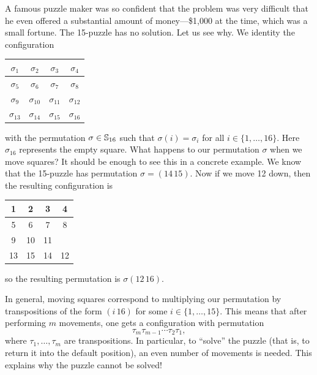 A famous puzzle maker was so confident that the problem was very difficult 
that he even offered a substantial amount of money—\$1,000 at the time, which was a small fortune. 
The 15-puzzle has no solution. Let us see why.
We identity the configuration 
\bigskip 
    \begin{center}
        \begin{tabular}{|c|c|c|c|}
            \hline
            $\sigma_1$ & $\sigma_2$ & $\sigma_3$ & $\sigma_4$\\
            \hline
            $\sigma_5$ & $\sigma_6$ & $\sigma_7$ & $\sigma_8$\\
            \hline
            $\sigma_9$ & $\sigma_{10}$ & $\sigma_{11}$ & $\sigma_{12}$\\
            \hline
            $\sigma_{13}$ & $\sigma_{14}$ & $\sigma_{15}$ & $\sigma_{16}$\\
            \hline
        \end{tabular}
    \end{center}
\bigskip 
with the permutation $\sigma\in\mathbb{S}_{16}$ such that  
$\sigma(i)=\sigma_i$ for all $i\in\{1,\dots,16\}$. Here $\sigma_{16}$ 
represents the empty square. What happens to our permutation 
$\sigma$ when we move squares? It should be enough to see 
this in a concrete example. We know that the 15-puzzle has
permutation $\sigma=(14\,15)$. Now if 
we move 12 down, then the resulting 
configuration is 
\bigskip 
    \begin{center}
        \begin{tabular}{|c|c|c|c|}
            \hline
            1 & 2 & 3 & 4\\
            \hline
            5 & 6 & 7 & 8\\
            \hline
            9 & 10 & 11 & \\
            \hline
            13 & 15 & 14 & 12\\
            \hline
        \end{tabular}
    \end{center}
\bigskip 
so the resulting permutation 
is $\sigma(12\,16)$. 

In general, moving squares correspond to multiplying  
our permutation by transpositions of the form $(i\,16)$ for
some $i\in\{1,\dots,15\}$. This means that 
after performing $m$ movements, 
one gets a configuration with 
permutation
\[
\tau_m\tau_{m-1}\cdots\tau_2\tau_1,
\]
where $\tau_1,\dots,\tau_m$ are transpositions. In particular, 
to ``solve'' the puzzle (that is, to return it into the default position), 
an even number of 
movements is needed. This explains why the puzzle cannot
be solved! 

